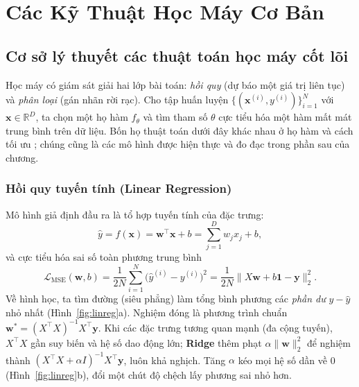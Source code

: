 \chapter{Các Kỹ Thuật Học Máy Cơ Bản}
\label{ch:hoc-may}

\section{Cơ sở lý thuyết các thuật toán học máy cốt lõi}

Học máy có giám sát giải hai lớp bài toán: \emph{hồi quy} (dự báo một giá trị liên tục) và \emph{phân loại} (gán
nhãn rời rạc). Cho tập huấn luyện $\{(\mathbf{x}^{(i)}, y^{(i)})\}_{i=1}^{N}$ với $\mathbf{x} \in \mathbb{R}^{D}$, ta chọn
một họ hàm $f_\theta$ và tìm tham số $\theta$ cực tiểu hóa một hàm mất mát trung bình trên dữ liệu. Bốn họ thuật toán
dưới đây khác nhau ở họ hàm và cách tối ưu \cite{raschka2015,goodfellow2016}; chúng cũng là các mô hình được hiện thực
và đo đạc trong phần sau của chương.

\subsection{Hồi quy tuyến tính (Linear Regression)}

Mô hình giả định đầu ra là tổ hợp tuyến tính của đặc trưng:
\begin{equation}
  \hat y = f(\mathbf{x}) = \mathbf{w}^\top\mathbf{x} + b = \sum_{j=1}^{D} w_j x_j + b ,
\end{equation}
và cực tiểu hóa sai số toàn phương trung bình
\begin{equation}
  \mathcal{L}_{\mathrm{MSE}}(\mathbf{w}, b) = \frac{1}{2N}\sum_{i=1}^{N}\big(\hat y^{(i)} - y^{(i)}\big)^2
    = \frac{1}{2N}\lVert X\mathbf{w} + b\mathbf{1} - \mathbf{y}\rVert_2^2 .
\end{equation}
Về hình học, ta tìm đường (siêu phẳng) làm tổng bình phương các \emph{phần dư} $y - \hat y$ nhỏ nhất
(Hình~\ref{fig:linreg}a). Nghiệm đóng là phương trình chuẩn $\mathbf{w}^* = (X^\top X)^{-1}X^\top\mathbf{y}$. Khi các
đặc trưng tương quan mạnh (đa cộng tuyến), $X^\top X$ gần suy biến và hệ số dao động lớn; \textbf{Ridge} thêm phạt
$\alpha\lVert\mathbf{w}\rVert_2^2$ để nghiệm thành $(X^\top X + \alpha I)^{-1}X^\top\mathbf{y}$, luôn khả nghịch. Tăng
$\alpha$ kéo mọi hệ số dần về 0 (Hình~\ref{fig:linreg}b), đổi một chút độ chệch lấy phương sai nhỏ hơn.

